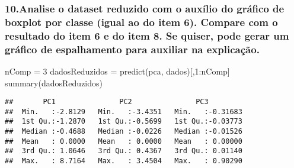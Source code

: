 \documentclass[
]{article}
\newenvironment{Shaded}{\begin{snugshade}}{\end{snugshade}}
\newcommand{\AttributeTok}[1]{\textcolor[rgb]{0.77,0.63,0.00}{#1}}
\newcommand{\ControlFlowTok}[1]{\textcolor[rgb]{0.13,0.29,0.53}{\textbf{#1}}}
\newcommand{\DecValTok}[1]{\textcolor[rgb]{0.00,0.00,0.81}{#1}}
\newcommand{\FunctionTok}[1]{\textcolor[rgb]{0.00,0.00,0.00}{#1}}
\newcommand{\NormalTok}[1]{#1}
\newcommand{\OtherTok}[1]{\textcolor[rgb]{0.56,0.35,0.01}{#1}}
\newcommand{\SpecialCharTok}[1]{\textcolor[rgb]{0.00,0.00,0.00}{#1}}
\newcommand{\StringTok}[1]{\textcolor[rgb]{0.31,0.60,0.02}{#1}}
\begin{document}
\hypertarget{analise-o-dataset-reduzido-com-o-auxuxedlio-do-gruxe1fico-de-boxplot-por-classe-igual-ao-do-item-6.-compare-com-o-resultado-do-item-6-e-do-item-8.-se-quiser-pode-gerar-um-gruxe1fico-de-espalhamento-para-auxiliar-na-explicauxe7uxe3o.}{%
\subsubsection{10.Analise o dataset reduzido com o auxílio do gráfico de
boxplot por classe (igual ao do item 6). Compare com o resultado do item
6 e do item 8. Se quiser, pode gerar um gráfico de espalhamento para
auxiliar na
explicação.}\label{analise-o-dataset-reduzido-com-o-auxuxedlio-do-gruxe1fico-de-boxplot-por-classe-igual-ao-do-item-6.-compare-com-o-resultado-do-item-6-e-do-item-8.-se-quiser-pode-gerar-um-gruxe1fico-de-espalhamento-para-auxiliar-na-explicauxe7uxe3o.}}

\begin{Shaded}
\begin{Highlighting}[]
\NormalTok{nComp }\OtherTok{=} \DecValTok{3}
\NormalTok{dadosReduzidos }\OtherTok{=} \FunctionTok{predict}\NormalTok{(pca, dados)[,}\DecValTok{1}\SpecialCharTok{:}\NormalTok{nComp]}
\FunctionTok{summary}\NormalTok{(dadosReduzidos)}
\end{Highlighting}
\end{Shaded}

\begin{verbatim}
##       PC1               PC2               PC3          
##  Min.   :-2.8129   Min.   :-3.4351   Min.   :-0.31683  
##  1st Qu.:-1.2870   1st Qu.:-0.5699   1st Qu.:-0.03773  
##  Median :-0.4688   Median :-0.0226   Median :-0.01526  
##  Mean   : 0.0000   Mean   : 0.0000   Mean   : 0.00000  
##  3rd Qu.: 1.0646   3rd Qu.: 0.4367   3rd Qu.: 0.01140  
##  Max.   : 8.7164   Max.   : 3.4504   Max.   : 0.90290
\end{verbatim}

\begin{Shaded}
\end{Shaded}
\end{document}
